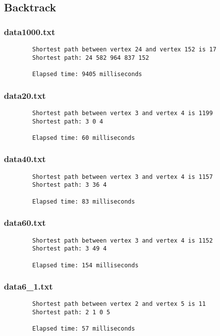 \documentclass{article}
\begin{document}
    \subsection*{Backtrack}

    \subsubsection*{data1000.txt}
    \begin{verbatim}
        Shortest path between vertex 24 and vertex 152 is 17
        Shortest path: 24 582 964 837 152

        Elapsed time: 9405 milliseconds
    \end{verbatim}

    \subsubsection*{data20.txt}
    \begin{verbatim}
        Shortest path between vertex 3 and vertex 4 is 1199
        Shortest path: 3 0 4

        Elapsed time: 60 milliseconds
    \end{verbatim}

    \subsubsection*{data40.txt}
    \begin{verbatim}
        Shortest path between vertex 3 and vertex 4 is 1157
        Shortest path: 3 36 4

        Elapsed time: 83 milliseconds
    \end{verbatim}

    \subsubsection*{data60.txt}
    \begin{verbatim}
        Shortest path between vertex 3 and vertex 4 is 1152
        Shortest path: 3 49 4

        Elapsed time: 154 milliseconds
    \end{verbatim}

    \subsubsection*{data6\_1.txt}
    \begin{verbatim}
        Shortest path between vertex 2 and vertex 5 is 11
        Shortest path: 2 1 0 5

        Elapsed time: 57 milliseconds
    \end{verbatim}
\end{document}
